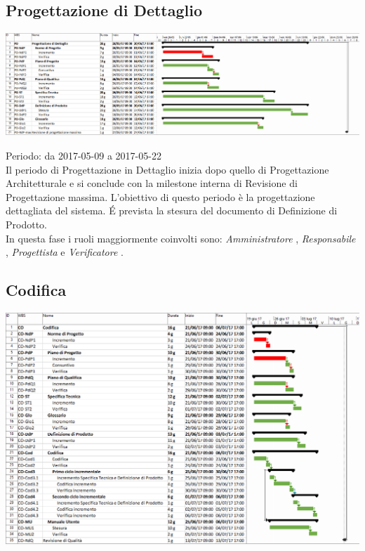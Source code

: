 \subsection{Progettazione di Dettaglio}

\begin{center}
  \includegraphics[scale=0.3]{img/4-PD.png}
\end{center}

Periodo: da 2017-05-09 a 2017-05-22 \\
Il periodo di Progettazione in Dettaglio inizia dopo quello di Progettazione Architetturale
e si conclude con la milestone interna di Revisione di Progettazione massima.
L’obiettivo di questo periodo è la progettazione dettagliata del sistema.
\'E prevista la stesura del documento di Definizione di Prodotto. \\
In questa fase i ruoli maggiormente coinvolti sono:  \emph{Amministratore} ,  \emph{Responsabile} ,
 \emph{Progettista}  e  \emph{Verificatore} .

\subsection{Codifica}

\begin{center}
  \includegraphics[scale=0.23]{img/5-CO.png}
\end{center}

